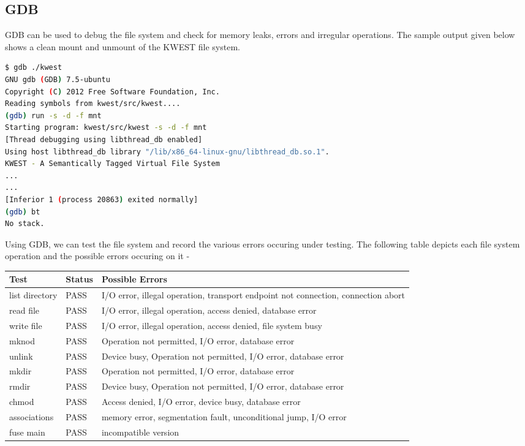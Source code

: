 \subsection*{GDB}
GDB can be used to debug the file system and check for memory leaks, errors and irregular operations. The sample output given below shows a clean mount and unmount of the KWEST file system.
\begin{lstlisting}[language=bash,frame=single]
$ gdb ./kwest
GNU gdb (GDB) 7.5-ubuntu
Copyright (C) 2012 Free Software Foundation, Inc.
Reading symbols from kwest/src/kwest....
(gdb) run -s -d -f mnt
Starting program: kwest/src/kwest -s -d -f mnt
[Thread debugging using libthread_db enabled]
Using host libthread_db library "/lib/x86_64-linux-gnu/libthread_db.so.1".
KWEST - A Semantically Tagged Virtual File System
...
...
[Inferior 1 (process 20863) exited normally]
(gdb) bt
No stack.
\end{lstlisting}

Using GDB, we can test the file system and record the various errors occuring under testing. The following table depicts each file system operation and the possible errors occuring on it - \\

\begin{tabular}{|p{3cm}|p{2cm}|p{8cm}|}
\hline
\textbf{Test} & \textbf{Status} & \textbf{Possible Errors} \\ \hline
list directory	&	PASS &  I/O error, illegal operation, transport endpoint not connection, connection abort \\ \hline
read file & PASS & I/O error, illegal operation, access denied, database error \\ \hline
write file & PASS & I/O error, illegal operation, access denied, file system busy \\ \hline
mknod & PASS & Operation not permitted, I/O error, database error \\ \hline
unlink & PASS & Device busy, Operation not permitted, I/O error, database error \\ \hline
mkdir & PASS & Operation not permitted, I/O error, database error \\ \hline
rmdir & PASS & Device busy, Operation not permitted, I/O error, database error \\ \hline
chmod & PASS & Access denied, I/O error, device busy, database error \\ \hline
associations & PASS & memory error, segmentation fault, unconditional jump, I/O error \\ \hline
fuse main & PASS & incompatible version \\
\hline
\end{tabular}

